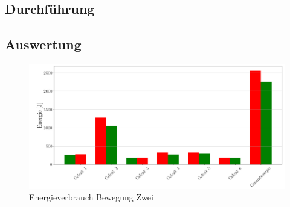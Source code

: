 \subsection{Durchführung}
\subsection{Auswertung}
%
\begin{figure}[tbph]
	\centering
	\includegraphics[width=1\linewidth]{images/e_up500}
	\caption{Energieverbrauch Bewegung Zwei}
	\label{fig:eup500}
\end{figure}
